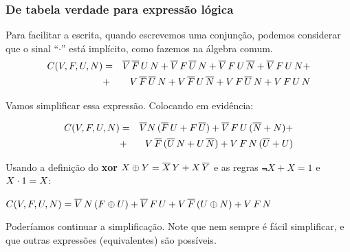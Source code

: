 \documentclass{beamer}
\begin{document}
\begin{frame}
 \frametitle{De tabela verdade para expressão lógica}

Para facilitar a escrita, quando escrevemos uma conjunção,
podemos considerar que o sinal ``$\cdot$'' está implícito,
como fazemos na álgebra comum.\\[-6pt] 

\begin{eqnarray*}
 C(V,F,U,N) & = & \overline{V} \, \overline{F} \, U       \, N +
                  \overline{V} \, F       \, \overline{U} \, N +
                  \overline{V} \, F       \, U       \, \overline{N} +
                  \overline{V} \, F       \, U       \, N +\\
            & + &
	          V \, \overline{F} \, \overline{U} \, N +
                  V \, \overline{F} \, U       \, \overline{N} +
                  V \, F       \, \overline{U} \, N +
                  V \, F       \, U       \, N
\end{eqnarray*}

\pause

Vamos simplificar essa expressão. Colocando em evidência:

\begin{eqnarray*}
C(V,F,U,N) & = & \overline{V} N \, ( \overline{F} \, U + F \, \overline{U} ) +
                 \overline{V} \, F \, U \, ( \overline{N} + N ) +\\
           & + & V \, \overline{F} \, ( \overline{U} \, N + U \, \overline{N} ) +
                 V \, F \, N \, ( \overline{U} + U )
\end{eqnarray*}

\pause

Usando a definição do \textbf{xor}
$X \oplus Y = \overline{X} \, Y + X \, \overline{Y}$ e as regras
 $\Not{X} + X = 1$ e $X \cdot 1 = X$:

\vspace{6pt}

$C(V,F,U,N) = \overline{V} \, N \, ( F \oplus U ) +
              \overline{V} \, F \, U +
              V \, \overline{F} \, ( U \oplus N ) +
              V \, F \, N
$

\pause

\vspace{6pt}

Poderíamos continuar a simplificação. Note que nem sempre é fácil simplificar,
e que outras expressões (equivalentes) são possíveis.

\end{frame}
\end{document}
